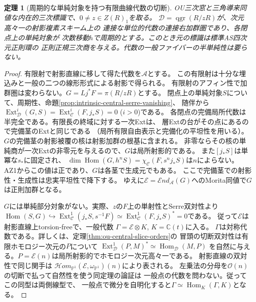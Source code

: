 \documentclass[11pt,a4paper]{ltjsarticle}
\newtheorem{theorem}{定理}[section]
\theoremstyle{definition}
\newcommand{\qgr}{\operatorname{qgr}}
\begin{document}
\begin{theorem}[周期的な単純対象を持つ有限曲線代数の切断]
\label{thm:ou-periodic-finite-curve-algebra}
OU三次窓と三角導来同値な内在的三次標識で、$0\ne z\in Z(R)_1$を取る。
$\mathcal D=\qgr(R/zR)$が、次元高々一の射影複素スキーム上の
連接な単位的代数の連接右加群圏であり、各閉点上の単純対象が
次数移動$h$で周期的とする。このとき元の標識は標準AS四次元正則環の
正則正規三次商を与える。代数の一般ファイバーの半単純性は要らない。
\end{theorem}
\begin{proof}
有限射で射影直線に移して得た代数を$\mathcal A$とする。
この有限射は十分な埋込みと一般の二つの線形形式による射影で得られる。
有限射のアフィン性で加群圏は変わらない。$G=Lj^*F=\pi(R/zR)$とする。
閉点上の単純対象$S$について、周期性、命題\ref{prop:intrinsic-central-serre-vanishing}、
随伴から$\operatorname{Ext}^{i}_{\mathcal D}(G,S)=
\operatorname{Ext}^{i}_{\mathcal C}(F,j_*S)=0$ ($i>0$)である。
各閉点の完備局所代数は半完全である。有限長の終域に対する一次Extは、
層Extの台がその点にあるので完備茎のExtと同じである
（局所有限自由表示と完備化の平坦性を用いる）。
$G$の完備茎の射影被覆の核は射影加群の根基に含まれる。
非零ならその核の単純商が一次Extの非零元を与えるので、$G$は局所射影的である。
また$[j_*S]$は単冪な$s_*$に固定され、
$\dim\operatorname{Hom}(G,h^n S)=\chi_{\mathcal C}(F,s^n j_*S)$は$n$によらない。
AZ1からこの値は正であり、$G$は各茎で生成元でもある。
ここで完備茎での射影性・生成性は忠実平坦性で降下する。
ゆえに$\mathcal E=\mathcal End_{\mathcal A}(G)$へのMorita同値で$G$は正則加群となる。

$G$には単純部分対象がない。実際、$z$の$F$上の単射性とSerre双対性より
$\operatorname{Hom}(S,G)\hookrightarrow
\operatorname{Ext}^1_{\mathcal C}(j_*S,s^{-1}F)
\simeq\operatorname{Ext}^1_{\mathcal C}(F,j_*S)^*=0$である。
従って$\mathcal E$は射影直線上torsion-freeで、一般代数
$\Gamma=\mathcal E\otimes K$, $K=\mathbb C(t)$に入る。
$\Gamma$は対称代数である。詳しくは、定理\ref{thm:ou-central-slice-orders}の
冒頭の切断双対性は有限ホモロジー次元の$P$について
$\operatorname{Ext}^1_{\mathcal D}(P,M)^*\simeq\operatorname{Hom}_{\mathcal D}(M,P)$
を自然に与える。$P=\mathcal E(n)$は局所射影的でホモロジー次元高々一である。
射影直線の双対性で同じ関手は
$\mathcal Hom_{\mathbb P^1}(\mathcal E,\omega_{\mathbb P^1})(n)$により表される。
左乗法の分母を$\mathcal O(n)$の切断で払って自然性を使う同定理の論証は
一般点の代数を問わない。従ってこの同型は両側線型で、
一般点で微分を自明化すると$\Gamma\simeq\operatorname{Hom}_K(\Gamma,K)$となる。


\end{proof}
\end{document}
